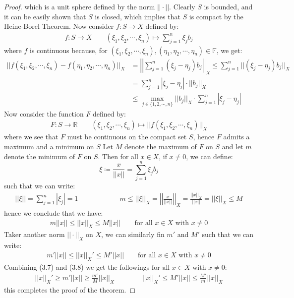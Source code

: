 \documentclass[11pt]{book}
\theoremstyle{break}
\theoremstyle{break}
\newcommand{\R}{\mathbb{R}}
\begin{document}
\begin{proof}
which is a unit sphere defined by the norm $||\cdot ||$. Clearly $S$ is bounded, and it can be easily shown that $S$ is closed, which implies that $S$ is compact by the Heine-Borel Theorem. Now consider $f:S \to X$ defined by:
\begin{align*}
f:S \to X \qquad (\xi_1,\xi_2,\cdots, \xi_n) \mapsto \sum_{j=1}^n \xi_j b_j 
\end{align*}
where $f$ is continuous because, for $(\xi_1,\xi_2,\cdots,\xi_n),(\eta_1,\eta_2,\cdots, \eta_n)\in \mathbb{F}$, we get:
\begin{align*}
||f(\xi_1,\xi_2,\cdots,\xi_n)-f(\eta_1,\eta_2,\cdots, \eta_n)||_X &= \left|\left|\sum_{j=1}^n (\xi_j - \eta_j) b_j \right|\right|_X \leq \sum_{j=1}^n ||(\xi_j -\eta_j) b_j ||_X \\
&= \sum_{j=1}^n |\xi_j -\eta_j| \cdot ||b_j||_X\\
&\leq \max_{j\in \{1,2,\cdots,n\}} ||b_j||_X \cdot \sum_{j=1}^n |\xi_j -\eta_j|
\end{align*}
Now consider the function $F$ defined by:
\begin{align*}
F:S \to \R \qquad (\xi_1,\xi_2,\cdots, \xi_n) \mapsto ||f(\xi_1,\xi_2,\cdots, \xi_n)||_X 
\end{align*}
where we see that $F$ must be continuous on the compact set $S$, hence $F$ admits a maximum and a minimum on $S$ Let $M$ denote the maximum of $F$ on $S$ and let $m$ denote the minimum of $F$ on $S$. Then for all $x\in X$, if $x \neq 0$, we can define: 
$$\xi \coloneqq \frac{x}{||x||} = \sum_{j=1}^n \xi_j b_j$$ 
such that we can write:
\begin{align*}
||\xi|| = \sum_{j=1}^n |\xi_j| = 1 \qquad\qquad\qquad m\leq ||\xi||_X = \left|\left|\frac{x}{||x||}\right|\right|_X = \frac{||x||_X}{||x||} =||\xi||_X \leq M
\end{align*}
hence we conclude that we have:
\begin{align}
m||x|| \leq ||x||_X \leq M||x|| \qquad\text{for all }x\in X\text{ with }x\neq 0 
\end{align}
Taker another norm $||\cdot ||_X$ on $X$, we can similarly fin $m'$ and $M'$ such that we can write:
\begin{align}
m'||x|| \leq ||x||_X' \leq M'||x|| \qquad\text{for all }x\in X\text{ with }x\neq 0
\end{align}
Combining (3.7) and (3.8) we get the followings $\text{for all }x\in X\text{ with }x\neq 0$:
\begin{align*}
||x||_X'\geq m'||x|| \geq \frac{m'}{M}||x||_X \qquad\qquad
||x||_X'\leq M'||x|| \leq \frac{M'}{m}||x||_X
\end{align*}
this completes the proof of the theorem. 
\end{proof}
\end{document}
